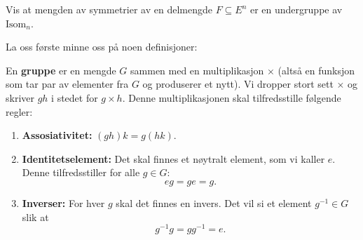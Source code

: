 \documentclass[11pt, norsk]{article}
\begin{document}
\begin{oppg}
Vis at mengden av symmetrier av en delmengde $F \subseteq E^n$ er en undergruppe av $\mathrm{Isom}_n$.
\end{oppg}
\begin{losn}
La oss første minne oss på noen definisjoner:
\begin{defi}
En \textbf{gruppe} er en mengde $G$ sammen med en multiplikasjon $\times$ (altså en funksjon som tar par av elementer fra $G$ og produserer et nytt). Vi dropper stort sett $\times$ og skriver $gh$ i stedet for $g \times h$. Denne multiplikasjonen skal tilfredsstille følgende regler:
\begin{enumerate}
\item \textbf{Assosiativitet:} $(gh)k=g(hk)$.
\item \textbf{Identitetselement:} Det skal finnes et nøytralt element, som vi kaller $e$. Denne tilfredsstiller for alle $g \in G$: $$eg=ge=g.$$
\item \textbf{Inverser:} For hver $g$ skal det finnes en invers. Det vil si et element $g^{-1} \in G$ slik at $$g^{-1}g = gg^{-1} = e.$$
\end{enumerate}
\end{defi}
\end{losn}
\end{document}

